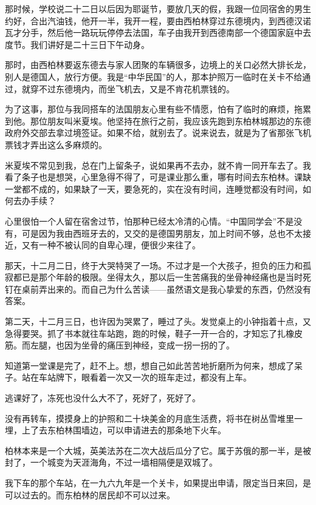\par 那时候，学校说二十二日以后因为耶诞节，要放几天的假，我跟一位同宿舍的男生约好，合出汽油钱，他开一半，我开一程，要由西柏林穿过东德境内，到西德汉诺瓦才分手，然后他一路玩玩停停去法国，车子由我开到西德南部一个德国家庭中去度节。我们讲好是二十三日下午动身。
\par 那时，由西柏林要返东德去与家人团聚的车辆很多，边境上的关口必然大排长龙，别人是德国人，放行方便。我是“中华民国”的人，那本护照万一临时在关卡不给通过，就穿不过东德境内，而坐飞机去，又是不肯花机票钱的。
\par 为了这事，那位与我同搭车的法国朋友心里有些不情愿，怕有了临时的麻烦，拖累到他。那位朋友叫米夏埃。他坚持在旅行之前，我应该先跑到东柏林城那边的东德政府外交部去拿过境签证。如果不给，就别去了。说来说去，就是为了省那张飞机票钱才弄出这么多麻烦的。
\par 米夏埃不常见到我，总在门上留条子，说如果再不去办，就不肯一同开车去了。我看了条子也是想哭，心里急得不得了，可是课业那么重，哪有时间去东柏林。课缺一堂都不成的，如果缺了一天，要急死的，实在没有时间，连睡觉都没有时间，如何去办手续？
\par 心里很怕一个人留在宿舍过节，怕那种已经太冷清的心情。“中国同学会”不是没有，可是因为我由西班牙去的，又交的是德国男朋友，加上时间不够，总也不太接近，又有一种不被认同的自卑心理，便很少来往了。
\par 那天，十二月二日，终于大哭特哭了一场。不过才是一个大孩子，担负的压力和孤寂都已是那个年龄的极限。坐得太久，那以后一生苦痛我的坐骨神经痛也是当时死钉在桌前弄出来的。而自己为什么苦读——虽然语文是我心挚爱的东西，仍然没有答案。
\par 第二天，十二月三日，也许因为哭累了，睡过了头。发觉桌上的小钟指着十点，又急得要哭。抓了书本就往车站跑，跑的时候，鞋子一开一合的，才知忘了扎橡皮筋。而左腿，也因为坐骨的痛压到神经，变成一拐一拐的了。
\par 知道第一堂课是完了，赶不上。想，想自己如此苦苦地折磨所为何来，想成了呆子。站在车站牌下，眼看着一次又一次的班车走过，都没有上车。
\par 逃课好了，冻死也没什么大不了，死好了，死好了。
\par 没有再转车，摸摸身上的护照和二十块美金的月底生活费，将书在树丛雪堆里一埋，上了去东柏林围墙边，可以申请进去的那条地下火车。
\par 柏林本来是一个大城，英美法苏在二次大战后瓜分了它。属于苏俄的那一半，是被封了，一个城变为天涯海角，不过一墙相隔便是双城了。
\par 我下车的那个车站，在一九六九年是一个关卡，如果提出申请，限定当日来回，是可以过去的。而东柏林的居民却不可以过来。
